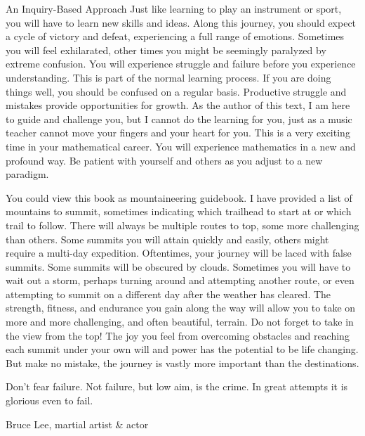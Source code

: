 \begin{section}{An Inquiry-Based Approach}
Just like learning to play an instrument or sport, you will have to learn new skills and ideas. Along this journey, you should expect a cycle of victory and defeat, experiencing a full range of emotions.  Sometimes you will feel exhilarated, other times you might be seemingly paralyzed by extreme confusion. You will experience struggle and failure before you experience understanding. This is part of the normal learning process. If you are doing things well, you should be confused on a regular basis. Productive struggle and mistakes provide opportunities for growth.  As the author of this text, I am here to guide and challenge you, but I cannot do the learning for you, just as a music teacher cannot move your fingers and your heart for you. This is a very exciting time in your mathematical career.  You will experience mathematics in a new and profound way. Be patient with yourself and others as you adjust to a new paradigm.

You could view this book as mountaineering guidebook.  I have provided a list of mountains to summit, sometimes indicating which trailhead to start at or which trail to follow.  There will always be multiple routes to top, some more challenging than others. Some summits you will attain quickly and easily, others might require a multi-day expedition.  Oftentimes, your journey will be laced with false summits.  Some summits will be obscured by clouds.  Sometimes you will have to wait out a storm, perhaps turning around and attempting another route, or even attempting to summit on a different day after the weather has cleared. The strength, fitness, and endurance you gain along the way will allow you to take on more and more challenging, and often beautiful, terrain. Do not forget to take in the view from the top! The joy you feel from overcoming obstacles and reaching each summit under your own will and power has the potential to be life changing.  But make no mistake, the journey is vastly more important than the destinations. 

\epigraph{Don't fear failure.  Not failure, but low aim, is the crime. In great attempts it is glorious even to fail.}{Bruce Lee, martial artist \& actor}

\end{section}

